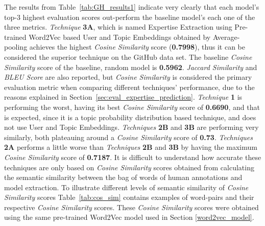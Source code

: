         The results from Table~\ref{tab:GH_results1} indicate very clearly that each model's top-$3$ highest evaluation scores out-perform the baseline model's each one of the three metrics. \emph{Technique} \textbf{3A}, which is named Expertise Extraction using Pre-trained Word2Vec based User and Topic Embeddings obtained by Average-pooling achieves the highest \emph{Cosine Similarity} score (\textbf{0.7998}), thus it can be considered the superior technique on the GitHub data set. The baseline \emph{Cosine Similarity} score of the baseline, random model is \textbf{0.5962}. \emph{Jaccard Similarity} and \emph{BLEU Score} are also reported, but \emph{Cosine Similarity} is considered the primary evaluation metric when comparing different techniques' performance, due to the reasons explained in Section~\ref{sec:eval_expertise_prediction}. \emph{Technique} \textbf{1} is performing the worst, having its best \emph{Cosine Similarity} score of \textbf{0.6690}, and that is expected, since it is a topic probability distribution based technique, and does not use User and Topic Embeddings. \emph{Techniques} \textbf{2B} and \textbf{3B} are performing very similarly, both plateauing around a \emph{Cosine Similarity} score of \textbf{0.73}. \emph{Techniques} \textbf{2A} performs a little worse than \emph{Techniques} \textbf{2B} and \textbf{3B} by having the maximum \emph{Cosine Similarity} score of \textbf{0.7187}. It is difficult to understand how accurate these techniques are only based on \emph{Cosine Similarity} scores obtained from calculating the semantic similarity between the bag of words of human annotations and model extraction. To illustrate different levels of semantic similarity of \emph{Cosine Similarity} scores Table~\ref{tab:cos_sim} contains examples of word-pairs and their respective \emph{Cosine Similarity} scores. These \emph{Cosine Similarity} scores were obtained using the same pre-trained Word2Vec model\cite{efstathiou2018word} used in Section \ref{word2vec_model}. 
        
